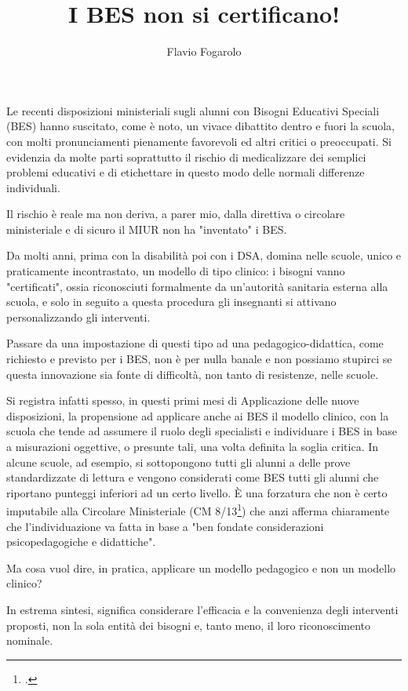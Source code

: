 \author{Flavio Fogarolo}
\title{I BES non si certificano!}
\label{cha:FlavioFogarolo19102013}
\maketitle
{}

Le recenti disposizioni ministeriali sugli alunni con Bisogni Educativi Speciali (BES) hanno suscitato, come è noto, un vivace dibattito dentro e fuori la scuola, con molti pronunciamenti pienamente favorevoli ed altri critici o preoccupati. Si evidenzia da molte parti soprattutto il rischio di medicalizzare dei semplici problemi educativi e di etichettare in questo modo delle normali differenze individuali.

Il rischio è reale ma non deriva, a parer mio, dalla direttiva o circolare ministeriale e di sicuro il MIUR non ha "inventato" i BES.

Da molti anni, prima con la disabilità poi con i DSA, domina nelle scuole, unico e praticamente incontrastato, un modello di tipo clinico: i bisogni vanno "certificati", ossia riconosciuti formalmente da un'autorità sanitaria esterna alla scuola, e solo in seguito a questa procedura gli insegnanti si attivano personalizzando gli interventi.

Passare da una impostazione di questi tipo ad una pedagogico-didattica, come richiesto e previsto per i BES, non è per nulla banale e non possiamo stupirci se questa innovazione sia fonte di difficoltà, non tanto di resistenze, nelle scuole.

Si registra infatti spesso, in questi primi mesi di Applicazione delle nuove disposizioni, la propensione ad applicare anche ai BES il modello clinico, con la scuola che tende ad assumere il ruolo degli specialisti e individuare i BES in base a misurazioni oggettive, o presunte tali, una volta definita la soglia critica. In alcune scuole, ad esempio, si sottopongono tutti gli alunni a delle prove standardizzate di lettura e vengono considerati come BES tutti gli alunni che riportano punteggi inferiori ad un certo livello. È una forzatura che non è certo imputabile alla Circolare Ministeriale (CM 8/13\footcite{cm8_2013}) che anzi afferma chiaramente che l'individuazione va fatta in base a "ben fondate considerazioni psicopedagogiche e didattiche".

Ma cosa vuol dire, in pratica, applicare un modello pedagogico e non un modello clinico?

In estrema sintesi, significa considerare l'efficacia e la convenienza degli interventi proposti, non la sola entità dei bisogni e, tanto meno, il loro riconoscimento nominale.

